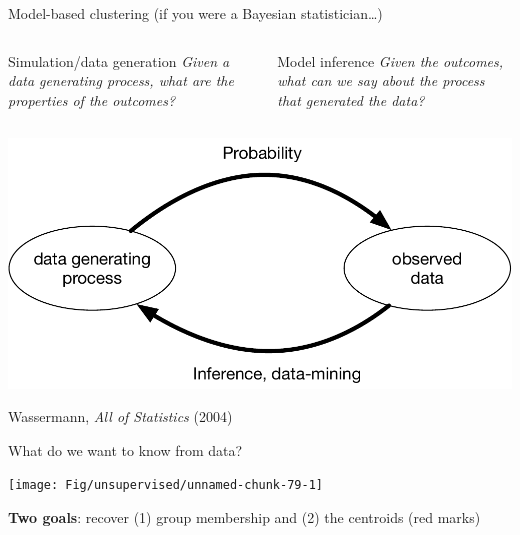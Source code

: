 \documentclass[
  ignorenonframetext,
  aspectratio=169]{beamer}
\begin{document}
\begin{frame}{Model-based clustering (if you were a Bayesian
statistician\ldots)}
\protect\hypertarget{model-based-clustering-if-you-were-a-bayesian-statistician}{}
\begin{columns}[T]
\begin{column}{.45\textwidth}
\begin{block}{Simulation/data generation}
\protect\hypertarget{simulationdata-generation}{}
\emph{Given a data generating process, what are the properties of the
outcomes?}
\end{block}
\end{column}

\begin{column}{.45\textwidth}
\begin{block}{Model inference}
\protect\hypertarget{model-inference}{}
\emph{Given the outcomes, what can we say about the process that
generated the data?}
\end{block}
\end{column}
\end{columns}

\scriptsize

\begin{center}\includegraphics[width=.7\linewidth]{./Vis/unsupervised/model_based_inference} \end{center}

\normalsize

\tiny

Wassermann, \emph{All of Statistics} (2004)

\scriptsize

\normalsize
\end{frame}

\begin{frame}{What do we want to know from data?}
\protect\hypertarget{what-do-we-want-to-know-from-data}{}
\scriptsize

\begin{center}\texttt{[image: Fig/unsupervised/unnamed-chunk-79-1]} \end{center}

\normalsize

\textbf{Two goals}: recover (1) group membership and (2) the centroids
(red marks)
\end{frame}
\end{document}
